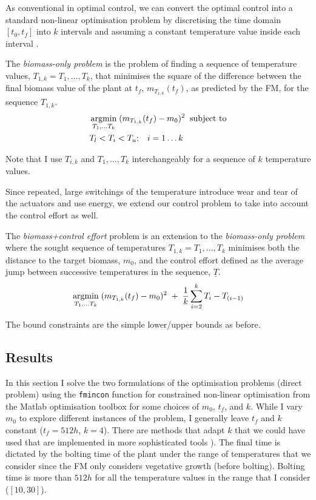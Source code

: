 As conventional in optimal control, we can convert the optimal control into a
standard non-linear optimisation problem by discretising the time domain
$[t_0, t_f]$ into $k$ intervals and assuming a constant temperature value inside
each interval \citep{kraft_converting_1985}.
\begin{definition}
The \emph{biomass-only problem} is the problem of finding a sequence of
temperature values, $T_{1, k}=T_1, \dots, T_k$, that minimises the square of the
difference between the final biomass value of the plant at $t_f$,
$m_{T_{1, k}}(t_f)$, as predicted by the FM, for the sequence $T_{1, k}$.
\begin{align*}
& \operatorname*{argmin}_{T_1, \dots T_k} \; (m_{T_{1, k}}(t_f) - m_0)^2 \; \; \text{subject to} \\
& T_l < T_{i} < T_u; \; \; \; i=1 \dots k
\end{align*}
\end{definition}
Note that I use $T_{i, k}$ and $T_1, \dots, T_k$ interchangeably for a sequence of
$k$ temperature values.

Since repeated, large switchings of the temperature introduce wear and tear of
the actuators and use energy, we extend our control problem to take into account
the control effort as well.

\begin{definition}
  The \emph{biomass+control effort} problem is an extension to the
  \emph{biomass-only problem} where the sought sequence of temperatures
  $T_{1, k}=T_1, \dots, T_k$ minimises both the distance to the target biomass,
  $m_0$, and the control effort defined as the average jump between successive
  temperatures in the sequence, $\underline{T}$.
$$ \operatorname*{argmin}_{T_1, \dots T_k} \; (m_{T_{1, k}}(t_f) - m_0)^2 \; + \; \frac{1}{k} \sum_{i=2}^{k} T_i - T_{(i-1)}$$
\end{definition}
The bound constraints are the simple lower/upper bounds as before. 

\subsection{Results}
In this section I solve the two formulations of the optimisation problems
(direct problem) using the \texttt{fmincon} function for constrained non-linear
optimisation from the Matlab optimisation toolbox for some choices of $m_0$,
$t_f$, and $k$. While I vary $m_0$ to explore different instances of the
problem, I generally leave $t_f$ and $k$ constant ($t_f=512h$, $k=4$). There
are methods that adapt $k$ that we could have used that are implemented in more
sophisticated tools \citep[mesh refinement, AMIGO
tool;][]{balsa-canto_amigo2_2016}). The final time is dictated by the bolting
time of the plant under the range of temperatures that we consider since the FM
only considers vegetative growth (before bolting). Bolting time is more than
$512h$ for all the temperature values in the range that I consider
($[10, 30]$).

